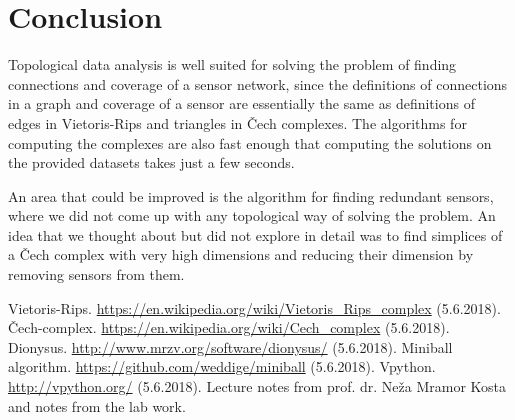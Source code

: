 \documentclass[a4paper, 12pt]{article}
\begin{document}
\section{Conclusion}

Topological data analysis is well suited for solving the problem of finding connections and coverage of a sensor network, since the definitions of connections in a graph and coverage of a sensor are essentially the same as definitions of edges in Vietoris-Rips and triangles in Čech complexes. The algorithms for computing the complexes are also fast enough that computing the solutions on the provided datasets takes just a few seconds.

An area that could be improved is the algorithm for finding redundant sensors, where we did not come up with any topological way of solving the problem. An idea that we thought about but did not explore in detail was to find simplices of a Čech complex with very high dimensions and reducing their dimension by removing sensors from them.


\clearpage

\begin{thebibliography}{99}
	\bibitem{} Vietoris-Rips. \url{https://en.wikipedia.org/wiki/Vietoris_Rips_complex} (5.6.2018).
	\bibitem{} Čech-complex. \url{https://en.wikipedia.org/wiki/Cech_complex} (5.6.2018).
	\bibitem{} Dionysus. \url{http://www.mrzv.org/software/dionysus/} (5.6.2018).
	\bibitem{} Miniball algorithm. \url{https://github.com/weddige/miniball} (5.6.2018).
	\bibitem{} Vpython. \url{http://vpython.org/} (5.6.2018).
	\bibitem{} Lecture notes from prof. dr. Neža Mramor Kosta and notes from the lab work.
\end{thebibliography}
\end{document}
